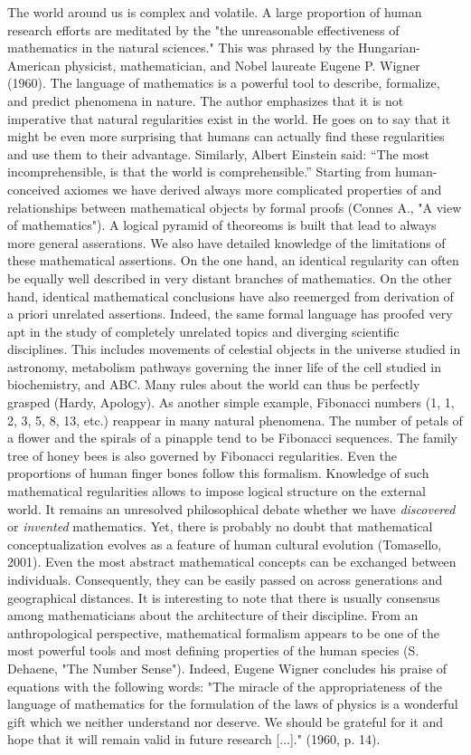 \documentclass[authoryear,review,3p]{elsarticle}
\begin{document}
The world around us is complex and volatile.
%
A large proportion of human research efforts are meditated by the 
"the unreasonable effectiveness of mathematics in the natural sciences."
This was phrased by the Hungarian-American
physicist, mathematician, and Nobel laureate Eugene P. Wigner (1960).
The language of mathematics is a powerful tool to
describe, formalize, and predict phenomena in nature.
The author emphasizes that it is not imperative that
natural regularities exist in the world. He goes on to
say that it might be even more surprising that humans can actually
find these regularities and use them to their advantage.
Similarly, Albert Einstein said:
“The most incomprehensible, is that the world is comprehensible.” 
%
Starting from human-conceived axiomes
we have derived always more complicated
properties of and relationships between mathematical objects by formal proofs
(Connes A., "A view of mathematics").
A logical pyramid of theoreoms is built that lead to always
more general asserations.
We also have detailed knowledge of the limitations of these mathematical
assertions.
%
On the one hand,
an identical regularity can often be equally well described in very distant
branches of mathematics.
On the other hand,
identical mathematical conclusions have also reemerged from derivation of
a priori unrelated assertions.
%
Indeed, the same formal language has proofed very apt in
the study of completely unrelated topics and diverging scientific disciplines.
This includes movements of celestial objects in the universe studied in astronomy,
metabolism pathways governing the inner life of the cell studied in biochemistry,
and
ABC.
%
Many rules about the world can thus be perfectly grasped
(Hardy, Apology).
As another simple example,
Fibonacci numbers (1, 1, 2, 3, 5, 8, 13, etc.)
reappear in many natural phenomena.
The number of petals of a flower and the spirals of a pinapple tend
to be Fibonacci sequences.
The family tree of honey bees is also governed by Fibonacci regularities.
Even the proportions of human finger bones follow this formalism.
Knowledge of such mathematical regularities
allows to impose logical structure on the external world.
%
It remains an unresolved philosophical debate whether we have
\textit{discovered} or \textit{invented} mathematics.
Yet, there is probably no doubt
that mathematical conceptualization
evolves as a feature of human cultural evolution (Tomasello, 2001).
Even the most abstract mathematical concepts can
be exchanged between individuals. Consequently,
they can be easily passed on across generations and geographical distances.
It is interesting to note that
there is usually consensus among mathematicians
about the architecture of their discipline.
From an anthropological perspective,
mathematical formalism
appears to be one of the most
powerful tools and most defining properties of the human species
(S. Dehaene, "The Number Sense").
Indeed,
Eugene Wigner concludes his praise of equations with the following words:
"The miracle of the appropriateness of the language of mathematics
for the formulation of the laws of physics is a wonderful gift
which we neither understand nor deserve. We should be grateful for
it and hope that it will remain valid in future research [...]."
(1960, p. 14).
\end{document}

